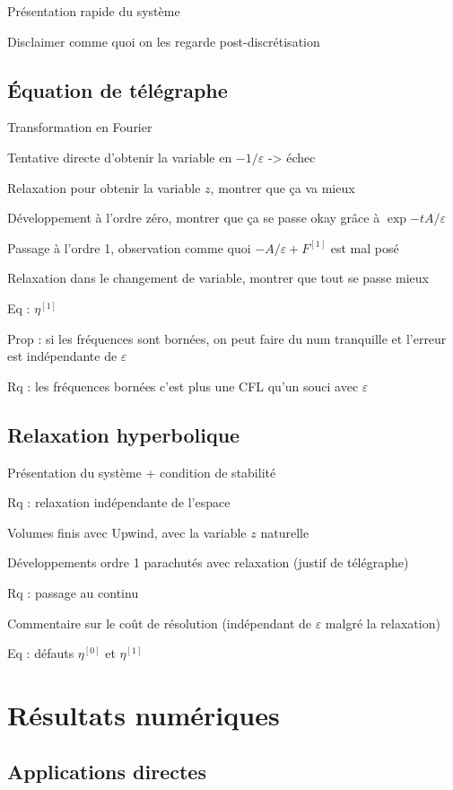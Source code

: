 Présentation rapide du système

Disclaimer comme quoi on les regarde post-discrétisation


\subsection{Équation de télégraphe}

Transformation en Fourier

Tentative directe d’obtenir la variable en $-1/\varepsilon$ -> échec

Relaxation pour obtenir la variable $z$, montrer que ça va mieux

Développement à l’ordre zéro, montrer que ça se passe okay grâce à
$\exp{-tA/\varepsilon}$

Passage à l’ordre 1, observation comme quoi $-A/\varepsilon + F^{[1]}$
est mal posé

Relaxation dans le changement de variable, montrer que tout se passe
mieux

Eq : $\eta^{[1]}$

Prop : si les fréquences sont bornées, on peut faire du num tranquille
et l’erreur est indépendante de $\varepsilon$

Rq : les fréquences bornées c’est plus une CFL qu’un souci avec
$\varepsilon$


\subsection{Relaxation hyperbolique}

Présentation du système + condition de stabilité

Rq : relaxation indépendante de l’espace

Volumes finis avec Upwind, avec la variable $z$ naturelle

Développements ordre 1 parachutés avec relaxation (justif de télégraphe)

Rq : passage au continu

Commentaire sur le coût de résolution (indépendant de $\varepsilon$
malgré la relaxation)

Eq : défauts $\eta^{[0]}$ et $\eta^{[1]}$




\section{Résultats numériques}

\subsection{Applications directes}

